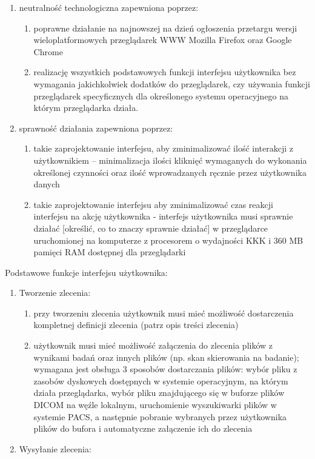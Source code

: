 \documentclass[a4paper]{report}
\begin{document}
\begin{enumerate}
    \item neutralność technologiczna zapewniona poprzez:
	  \begin{enumerate}
	  \item poprawne działanie na najnowszej na dzień ogłoszenia przetargu wersji wieloplatformowych przeglądarek WWW Mozilla Firefox oraz Google Chrome
	  \item realizację wszystkich podstawowych funkcji interfejsu użytkownika bez wymagania jakichkolwiek dodatków do przeglądarek, czy używania funkcji przeglądarek specyficznych dla określonego systemu operacyjnego na którym przeglądarka działa.
	  \end{enumerate}
    \item sprawność działania zapewniona poprzez:
	  \begin{enumerate}
	  \item takie zaprojektowanie interfejsu, aby zminimalizować ilość interakcji z użytkownikiem -- minimalizacja ilości kliknięć wymaganych do wykonania określonej czynności oraz ilość wprowadzanych ręcznie przez użytkownika danych
	  \item takie zaprojektowanie interfejsu aby zminimalizować czas reakcji interfejsu na akcję użytkownika - interfejs użytkownika musi sprawnie działać [określić, co to znaczy sprawnie działać] w przeglądarce uruchomionej na komputerze z procesorem o wydajności KKK i 360 MB pamięci RAM dostępnej dla przeglądarki
	  \end{enumerate}
\end{enumerate}

Podstawowe funkcje interfejsu użytkownika:
\begin{enumerate}
  \item Tworzenie zlecenia:
      \begin{enumerate}
      \item przy tworzeniu zlecenia użytkownik musi mieć możliwość dostarczenia kompletnej definicji zlecenia (patrz opis treści zlecenia)
      \item użytkownik musi mieć możliwość załączenia do zlecenia plików z wynikami badań oraz innych plików (np. skan  skierowania na badanie); wymagana jest obsługa 3 sposobów dostarczania plików: wybór pliku z zasobów dyskowych dostępnych w systemie operacyjnym, na którym działa przeglądarka, wybór pliku znajdującego się w buforze plików DICOM na węźle lokalnym, uruchomienie wyszukiwarki plików w systemie PACS, a następnie pobranie wybranych przez użytkownika plików do bufora i automatyczne załączenie ich do zlecenia
      \end{enumerate}
  \item Wysyłanie zlecenia:
\end{enumerate}
\end{document}
